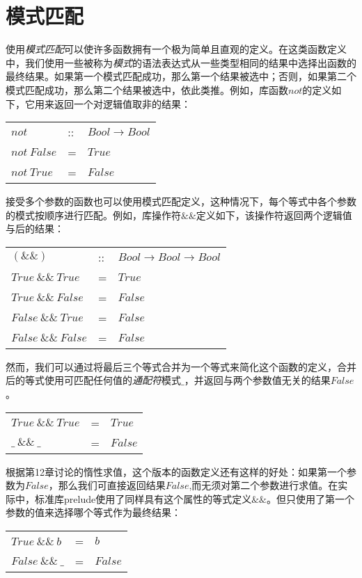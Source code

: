 \section{模式匹配}

使用\textit{模式匹配}可以使许多函数拥有一个极为简单且直观的定义。在这类函数定义中，我们使用一些被称为\textit{模式}的语法表达式从一些类型相同的结果中选择出函数的最终结果。如果第一个模式匹配成功，那么第一个结果被选中；否则，如果第二个模式匹配成功，那么第二个结果被选中，依此类推。例如，库函数$not$的定义如下，它用来返回一个对逻辑值取非的结果：

\begin{tabular}[t]{lll}
$not$&::&$Bool \rightarrow Bool$\\
$not~False$&=&$True$\\
$not~True$&=&$False$\\
\end{tabular}

接受多个参数的函数也可以使用模式匹配定义，这种情况下，每个等式中各个参数的模式按顺序进行匹配。例如，库操作符$\&\&$定义如下，该操作符返回两个逻辑值与后的结果：

\begin{tabular}[t]{lll}
$(\&\&)$&::&$Bool \rightarrow Bool \rightarrow Bool$\\
$True~\&\&~True$&=&$True$\\
$True~\&\&~False$&=&$False$\\
$False~\&\&~True$&=&$False$\\
$False~\&\&~False$&=&$False$\\
\end{tabular}

然而，我们可以通过将最后三个等式合并为一个等式来简化这个函数的定义，合并后的等式使用可匹配任何值的\textit{通配符}模式$\_$，并返回与两个参数值无关的结果$False$。

\begin{tabular}[t]{lll}
$True~\&\&~True$&=&$True$\\
$\_~\&\&~\_$&=&$False$\\
\end{tabular}

根据第12章讨论的惰性求值，这个版本的函数定义还有这样的好处：如果第一个参数为$False$，那么我们可直接返回结果$False$,而无须对第二个参数进行求值。在实际中，标准库prelude使用了同样具有这个属性的等式定义$\&\&$。但只使用了第一个参数的值来选择哪个等式作为最终结果：

\begin{tabular}[t]{lll}
$True~\&\&~b$&=&$b$\\
$False~\&\&~\_$&=&$False$\\
\end{tabular}


